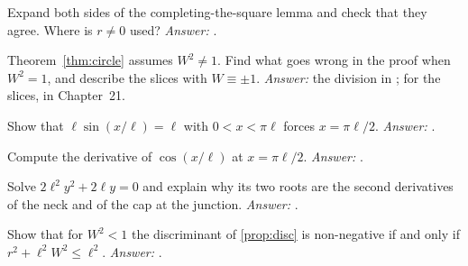 \begin{exercise}
Expand both sides of the completing-the-square lemma and check that they agree. Where is $r\ne0$ used? \emph{Answer:} .
\end{exercise}

\begin{exercise}
Theorem~\ref{thm:circle} assumes $W^2\ne1$. Find what goes wrong in the proof when $W^2=1$, and describe the slices with $W\equiv\pm1$. \emph{Answer:} the division in ; for the slices,  in Chapter~21.
\end{exercise}

\begin{exercise}
Show that $\ell\sin(x/\ell)=\ell$ with $0<x<\pi\ell$ forces $x=\pi\ell/2$. \emph{Answer:} .
\end{exercise}

\begin{exercise}
Compute the derivative of $\cos(x/\ell)$ at $x=\pi\ell/2$. \emph{Answer:} .
\end{exercise}

\begin{exercise}
Solve $2\ell^2y^2+2\ell y=0$ and explain why its two roots are the second derivatives of the neck and of the cap at the junction. \emph{Answer:} .
\end{exercise}

\begin{exercise}
Show that for $W^2<1$ the discriminant of \cref{prop:disc} is non-negative if and only if $r^2+\ell^2W^2\le\ell^2$. \emph{Answer:} .
\end{exercise}
